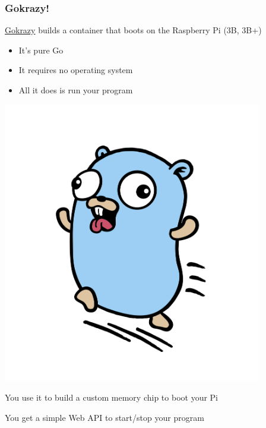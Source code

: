 \documentclass[handout,compress,t,11pt]{beamer}
\begin{document}
\begin{frame}[fragile]
    \frametitle{Gokrazy!}
\href{https://gokrazy.org}{Gokrazy} builds a container that boots on
the Raspberry Pi (3B, 3B+)
    \begin{minipage}[c]{0.55\textwidth}
\begin{itemize}
    \item It's pure Go
    \item It requires no operating system
    \item All it does is run your program
\end{itemize}
    \end{minipage}%
    \begin{minipage}[c]{0.35\textwidth}
        \vspace{0.5\baselineskip}
        \hfill \includegraphics[width=0.85\textwidth,height=.5\textheight]{gokrazy-logo.png}
    \end{minipage} \par
\vspace{1.5\baselineskip}
You use it to build a custom memory chip to boot your Pi \par
\vspace{0.4\baselineskip}
You get a simple Web API to start/stop your program
\end{frame}
\end{document}
